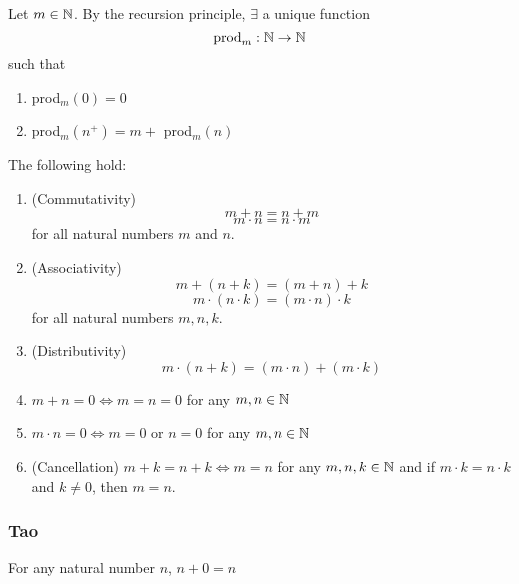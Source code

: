 \documentclass[12pt]{article}
\begin{document}
\begin{defn} \label{defn:mult}
    Let $m \in \mathbb{N}$. By the recursion principle, $\exists$ a unique function
    \[
        \text{prod}_{m} : \mathbb{N} \to \mathbb{N}
    \]
    such that
    \begin{enumerate}[label=(\alph*)]
        \item prod$_{m}(0) = 0$
        \item prod$_{m}(n^{+}) = m + $ prod$_{m}(n)$
    \end{enumerate}
\end{defn}

\begin{thm} \label{thm:properties}
    The following hold:
    \begin{enumerate}[label=(\alph*)]
        \item\label{thm:comm} (Commutativity)
        \[
            m + n = n + m
        \]
        \[
            m \cdot n = n \cdot m
        \]
        for all natural numbers $m$ and $n$.

        \item\label{thm:asso} (Associativity)
        \[
            m + (n + k) = (m + n) + k
        \] \[
            m \cdot (n \cdot k) = (m \cdot n) \cdot k
        \]
        for all natural numbers $m, n, k$.

        \item\label{thm:dist} (Distributivity)
        \[
            m \cdot (n + k) = (m \cdot n) + (m \cdot k)
        \]
        
        \item\label{thm:m+n=0} $m + n = 0 \iff m = n = 0$ for any $m, n \in \mathbb{N}$

        \item $m \cdot n = 0 \iff m = 0$ or $n = 0$ for any $m, n \in \mathbb{N}$

        \item (Cancellation) $m + k = n + k \iff m = n$ for any $m, n, k \in \mathbb{N}$ and if $m \cdot k = n \cdot k$ and $k \neq 0$, then $m = n$.
    \end{enumerate}
\end{thm}

\subsubsection{Tao}

\begin{lem} \label{lem:n+0=n}
For any natural number $n$, $n+0=n$
\end{lem}
\end{document}
